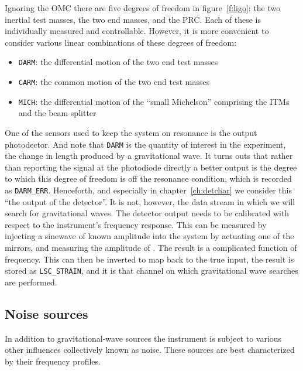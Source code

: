 Ignoring the OMC there are five degrees of freedom in
figure~\ref{f:ligo}: the two inertial test masses, the two end masses,
and the PRC.  Each of these is individually measured and controllable.
However, it is more convenient to consider various linear combinations
of these degrees of freedom:

\begin{itemize}
\item \texttt{DARM}: the differential motion of the two end test masses
\item \texttt{CARM}: the common motion of the two end test masses
\item \texttt{MICH}: the differential motion of the ``small Michelson'' comprising
the ITMs and the beam splitter
\end{itemize}

One of the sensors used to keep the system on resonance is the output
photodector.  And note that \texttt{DARM} is the quantity of interest
in the experiment, the change in length produced by a gravitational
wave.    It turns outs that rather than reporting the signal at the
photodiode directly a better output is the degree to which this degree
of freedom is off the resonance condition, which is recorded as
\texttt{DARM\_ERR}.  Henceforth, and especially in
chapter~\ref{ch:detchar} we consider this ``the output of the
detector''.  It is not, however, the data stream in which we will
search for gravitational waves.  The detector output needs to be
calibrated with respect to the instrument's frequency response.  This
can be measured by injecting a sinewave of known amplitude into the
system by actuating one of the mirrors, and measuring the amplitude of
\darmerr.  The result is a complicated function of frequency.  This
can then be inverted to map \darmerr back to the true input, the
result is stored as \texttt{LSC\_STRAIN}, and it is that channel on
which gravitational wave searches are performed.

\subsection{Noise sources}

In addition to gravitational-wave sources the instrument is subject to
various other influences collectively known as noise.  These sources
are best characterized by their frequency profiles.

